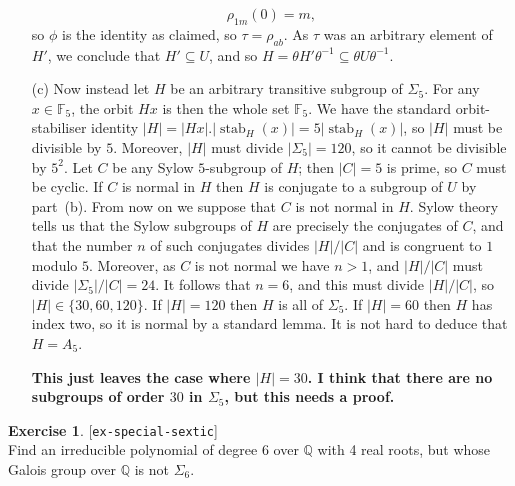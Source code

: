 \documentclass{amsart}
\newcommand{\stab}	{\operatorname{stab}}
\newcommand{\Q}         {{\mathbb{Q}}}
\newcommand{\F}         {{\mathbb{F}}}
\newcommand{\tht}       {\theta}
\newcommand{\Sg}        {\Sigma}
\newcommand{\sse}       {\subseteq}
\renewcommand{\:}{\colon}
\newcommand{\lastexlabel}{}
\newcommand{\exlabel}[1]{
 \global\def\lastexlabel{#1}\label{#1}[\texttt{#1}]\ \\
}
\newcommand{\exlabel}[1]{
 \global\def\lastexlabel{#1}\label{#1}
}
\newenvironment{solution}{\SolutionInline}{\endSolutionInline}
\theoremstyle{definition}
\newtheorem{exercise}{Exercise}[section]
\renewenvironment{solution}{\SolutionAtEnd}{\endSolutionAtEnd}
\begin{document}
\begin{solution}
\begin{itemize}
\[       \rho_{1m}(0) = m,
   \]
   so $\phi$ is the identity as claimed, so $\tau=\rho_{ab}$.  As
   $\tau$ was an arbitrary element of $H'$, we conclude that
   $H'\sse U$, and so $H=\tht H'\tht^{-1}\sse\tht U\tht^{-1}$.
  \item[(c)] Now instead let $H$ be an arbitrary transitive subgroup
   of $\Sg_5$.  For any $x\in\F_5$, the orbit $Hx$ is then the whole
   set $\F_5$.  We have the standard orbit-stabiliser identity
   $|H|=|Hx|.|\stab_H(x)|=5|\stab_H(x)|$, so $|H|$ must be divisible
   by $5$.  Moreover, $|H|$ must divide $|\Sg_5|=120$, so it cannot be
   divisible by $5^2$.  Let $C$ be any Sylow $5$-subgroup of $H$; then
   $|C|=5$ is prime, so $C$ must be cyclic.  If $C$ is normal in $H$
   then $H$ is conjugate to a subgroup of $U$ by part~(b).  From now
   on we suppose that $C$ is not normal in $H$.  Sylow theory tells us
   that the Sylow subgroups of $H$ are precisely the conjugates of
   $C$, and that the number $n$ of such conjugates divides
   $|H|/|C|$ and is congruent to $1$ modulo $5$.  Moreover, as $C$ is
   not normal we have $n>1$, and $|H|/|C|$ must divide
   $|\Sg_5|/|C|=24$.  It follows that $n=6$, and this must divide
   $|H|/|C|$, so $|H|\in\{30,60,120\}$.  If $|H|=120$ then $H$ is all
   of $\Sg_5$.  If $|H|=60$ then $H$ has index two, so it is normal by
   a standard lemma.  It is not hard to deduce that $H=A_5$.  

   \textbf{This just leaves the case where $|H|=30$. I think that
    there are no subgroups of order $30$ in $\Sg_5$, but this needs a
    proof. }
 \end{itemize}
\end{solution}
\begin{exercise}\exlabel{ex-special-sextic}
 Find an irreducible polynomial of degree 6 over $\Q$ with 4 real roots,
 but whose Galois group over $\Q$ is not $\Sg_6$.
\end{exercise}
\end{document}
